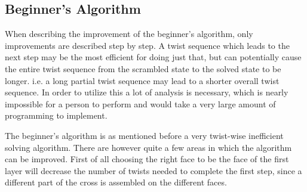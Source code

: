 

\subsection{Beginner's Algorithm}

When describing the improvement of the beginner's algorithm, only improvements are described step by step. 
A twist sequence which leads to the next step may be the most efficient for doing just that, but can potentially cause the entire twist sequence from the scrambled state to the solved state to be longer. 
i.e. a long partial twist sequence may lead to a shorter overall twist sequence. In order to utilize this a lot of analysis is necessary, which is nearly impossible for a person to perform and would take a very large amount of programming to implement.


The beginner's algorithm is as mentioned before a very twist-wise inefficient solving algorithm. 
There are however quite a few areas in which the algorithm can be improved.
First of all choosing the right face to be the face of the first layer will decrease the number of twists needed to complete the first step, since a different part of the cross is assembled on the different faces.
